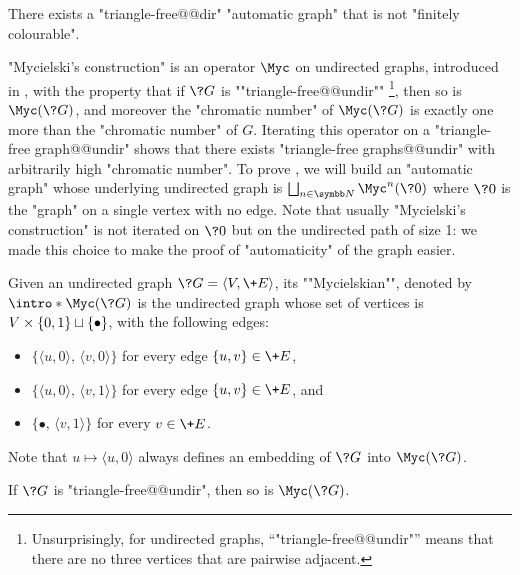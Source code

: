 \begin{proposition}
	\AP\label{prop:automatic-graph-not-fin-colourable}
	There exists a "triangle-free@@dir" "automatic graph" that is not "finitely colourable".
\end{proposition}

"Mycielski's construction" is an operator $\Myc$ on undirected graphs,
introduced in \cite{Mycielski55Coloriage}, with the property that if $\?G$ is \AP""triangle-free@@undir""%
\footnote{Unsurprisingly, for undirected graphs, ``"triangle-free@@undir"'' means that there are no
three vertices that are pairwise adjacent.},
then so is $\Myc(\?G)$, and moreover
the "chromatic number" of $\Myc(\?G)$ is exactly one more than the "chromatic number" of $G$.
Iterating this operator on a "triangle-free graph@@undir" shows that there exists
"triangle-free graphs@@undir" with arbitrarily high "chromatic number".
To prove , we will build
an "automatic graph" whose underlying undirected graph is
$\bigdcup_{n\in\N} \Myc^n(\?0)$ where $\?0$ is the "graph" on a single vertex with no edge.
Note that usually "Mycielski's construction" is not iterated on $\?0$ but on the undirected
path of size 1: we made this choice to make the proof of "automaticity" of the graph
easier.

\begin{definition}
	Given an undirected graph $\?G = \langle V, \+E \rangle$, its \AP""Mycielskian"",
	denoted by \AP$\intro*\Myc(\?G)$ is the undirected graph whose set of vertices is
	$V\times\{0,1\} \sqcup \{\bullet\}$, with the following edges:
	\begin{itemize}
		\item $\{\langle u, 0 \rangle,\, \langle v, 0 \rangle\}$
			for every edge $\{ u,v \} \in \+E$,
		\item $\{\langle u, 0 \rangle,\, \langle v, 1 \rangle\}$
			for every edge $\{ u,v \} \in \+E$, and
		\item $\{ \bullet,\, \langle v, 1 \rangle\}$
			for every $v \in \+E$.
	\end{itemize}
\end{definition}

Note that $u \mapsto \langle u,0\rangle$ always defines an embedding of
$\?G$ into $\Myc(\?G)$.

\begin{property}
	\label{prop:triangle-free}
	If $\?G$ is "triangle-free@@undir", then so is $\Myc(\?G)$.
\end{property}

